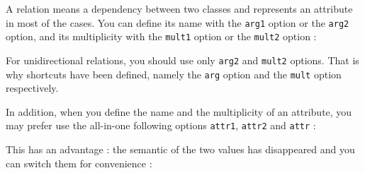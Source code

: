 \documentclass[a4paper,11pt]{report}
\newcommand{\inputTikZ}[1]{%
  }%
\newcommand{\inputTikZ}[1]{%
    \texttt{[image: fig/\#1.pdf]}%
  }%
\begin{document}
A relation means a dependency between two classes and represents an attribute in most of the cases. You can define its name with the {\tt arg1} option or the {\tt arg2} option, and its multiplicity with the {\tt mult1} option or the {\tt mult2} option :

\medskip

\begin{minipage}{0.5\textwidth}

\end{minipage}
\begin{minipage}{0.4\textwidth}
\begin{center}
\inputTikZ{relationarg}
\end{center}
\end{minipage}

\medskip

For unidirectional relations, you should use only {\tt arg2} and {\tt mult2} options. That is why shortcuts have been defined, namely the {\tt arg} option and the {\tt mult} option respectively.

In addition, when you define the name and the multiplicity of an attribute, you may prefer use the all-in-one following options {\tt attr1}, {\tt attr2} and {\tt attr} :

\medskip

\begin{minipage}{0.5\textwidth}

\end{minipage}
\begin{minipage}{0.4\textwidth}
\begin{center}
\inputTikZ{relationattr}
\end{center}
\end{minipage}

\medskip

This has an advantage : the semantic of the two values has disappeared and you can switch them for convenience :

\medskip

\begin{minipage}{0.5\textwidth}

\end{minipage}
\begin{minipage}{0.4\textwidth}
\begin{center}
\inputTikZ{relationattr2}
\end{center}
\end{minipage}

\medskip
\end{document}
